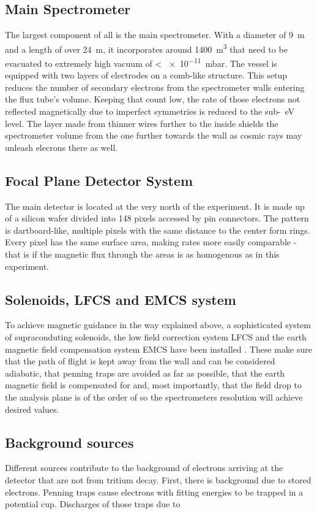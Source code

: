       \subsection{Main Spectrometer}
      \label{ch:The KATRIN experiment:sec:Experimental setup:subsec:MainSpec}
      The largest component of all is the main spectrometer. With a diameter of \SI{9}{\meter} and a length of over \SI{24}{\meter}, it incorporates around \SI{1400}{\cubic\meter} that need to be evacuated to extremely high vacuum of < \SI{e-11}{\milli\bar}. The vessel is equipped with two layers of electrodes on a comb-like structure. This setup reduces the number of secondary electrons from the spectrometer walls entering the flux tube's volume. Keeping that count low, the rate of those electrons not reflected magnetically due to imperfect symmetries is reduced to the sub-\SI{}{\electronvolt} level. The layer made from thinner wires further to the inside shields the spectrometer volume from the one further towards the wall as cosmic rays may unleash elecrons there as well. 
      
      \subsection{Focal Plane Detector System}
      \label{ch:The KATRIN experiment:sec:Experimental setup:subsec:FPD system}
      The main detector is located at the very north of the experiment. It is made up of a silicon wafer divided into 148 pixels accessed by pin connectors. The pattern is dartboard-like, multiple pixels with the same distance to the center form rings. Every pixel has the same surface area, making rates more easily comparable - that is if the magnetic flux through the areas is as homogenous as in this experiment.
      \subsection{Solenoids, LFCS and EMCS system}
      To achieve magnetic guidance in the way explained above, a sophisticated system of supraconduting solenoids, the low field correction system LFCS and the earth magnetic field compensation system EMCS have been installed \cite{airCoilSystem}. These make sure that the path of flight is kept away from the wall and can be considered adiabatic, that penning traps are avoided as far as possible, that the earth magnetic field is compensated for and, most importantly, that the field drop to the analysis plane is of the order of  so the spectrometers resolution will achieve desired values.
      \label{ch:The KATRIN experiment:sec:Experimental setup:subsec:Solenoids, LFCS and EMCS system}
      

      \subsection{Background sources}
      \label{ch:The KATRIN experiment:sec:Experimental setup:subsec:BackgroundSources}
      Different sources contribute to the background of electrons arriving at the detector that are not from tritium decay. First, there is background due to stored electrons. Penning traps cause electrons with fitting energies to be trapped in a potential cup. Discharges of those traps due to 